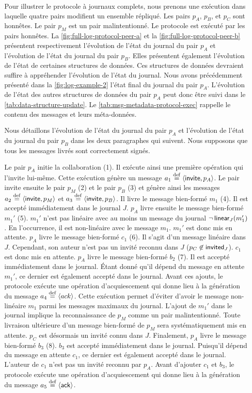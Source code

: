 Pour illustrer le protocole à journaux complets, nous prenons une exécution dans laquelle quatre pairs modifient un ensemble répliqué.
Les pairs $p_A$, $p_B$, et $p_C$ sont honnêtes.
Le pair $p_M$ est un pair malintentionné.
Le protocole est exécuté par les pairs honnêtes.
La \autoref{fig:full-log-protocol-peer-a} et la \autoref{fig:full-log-protocol-peer-b} présentent respectivement l'évolution de l'état du journal du pair $p_A$ et l'évolution de l'état du journal du pair $p_B$.
Elles présentent également l'évolution de l'état de certaines structures de données.
Ces structures de données devraient suffire à appréhender l'évolution de l'état du journal.
Nous avons précédemment présenté dans la \autoref{fig:log-example-2} l'état final du journal du pair $p_A$.
L'évolution de l'état des autres structures de données du pair $p_A$ peut donc être suivi dans le \autoref{tab:data-structure-update}.
Le \autoref{tab:msg-metadata-protocol-exec} rappelle le contenu des messages et leurs méta-données.

Nous détaillons l'évolution de l'état du journal du pair $p_A$ et l'évolution de l'état du journal du pair $p_B$ dans les deux paragraphes qui suivent.
Nous supposons que tous les messages livrés sont correctement signés.

Le pair $p_A$ initie la collaboration (1).
Il exécute ainsi une première opération qui l'invite lui-même.
Cette exécution génère un message $a_1 \defeq \tuple*{\trm{invite}, p_A}$.
Le pair invite ensuite le pair $p_M$ (2) et le pair $p_B$ (3) et génère ainsi les messages $a_2 \defeq \tuple*{\trm{invite}, p_M}$ et $a_3 \defeq \tuple*{\trm{invite}, p_B}$.
Il livre le message bien-formé $m_1$ (4).
Il est accepté immédiatement dans le journal $J$.
$p_A$ livre ensuite le message bien-formé $m_1'$ (5).
$m_1'$ n'est pas linéaire avec au moins un message du journal $\neg \trm{linear}_J(m_1')$.
En l'occurrence, il est non-linéaire avec le message $m_1$.
$m_1'$ est donc mis en attente.
$p_A$ livre le message bien-formé $c_1$ (6).
Il s'agit d'un message linéaire dans $J$.
Cependant, son auteur n'est pas un invité reconnu dans $J$ ($p_C \not\in \trm{invited}_J$).
$c_1$ est donc mis en attente.
$p_A$ livre le message bien-formé $b_2$ (7).
Il est accepté immédiatement dans le journal.
Étant donné qu'il dépend du message en attente $m_1'$, ce dernier est également accepté dans le journal.
Avant ces ajouts, le protocole exécute une opération d'acquiescement qui donne lieu à la génération du message $a_4 \defeq \tuple*{ack}$.
Cette exécution permet d'éviter d'avoir le message non-linéaire $m_1$ parmi les messages maximaux du journal.
L'ajout de $m_1'$ dans le journal implique la reconnaissance de $p_M$ comme un pair malintentionné.
Toute livraison ultérieure d'un message bien-formé de $p_M$ sera systématiquement mis en attente.
$p_C$ est désormais un invité connu dans $J$.
Finalement, $p_A$ livre le message bien-formé $b_3$ (8).
$b_3$ est accepté immédiatement dans le journal.
Puisqu'il dépend du message en attente $c_1$, ce dernier est également accepté dans le journal.
L'auteur de $c_1$ n'est pas un invité reconnu par $p_A$.
Avant d'ajouter $c_1$ et $b_3$, le protocole exécute une opération d'acquiescement qui donne lieu à la génération du message $a_5 \defeq \tuple*{\trm{ack}}$.

